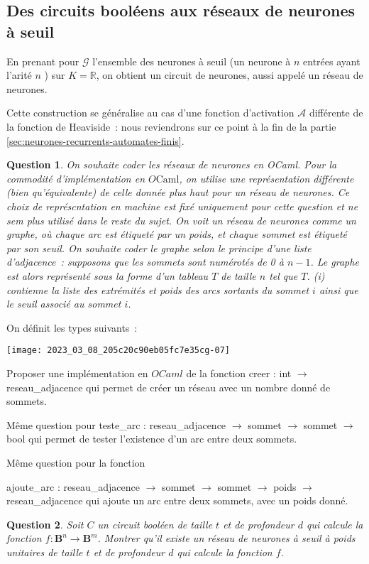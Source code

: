 \documentclass[10pt]{article}
\newtheorem{question}{Question}
\begin{document}
\subsection{Des circuits booléens aux réseaux de neurones à seuil}
En prenant pour $\mathcal{G}$ l'ensemble des neurones à seuil (un neurone à $n$ entrées ayant l'arité $n$ ) sur $K=ℝ$, on obtient un circuit de neurones, aussi appelé un réseau de neurones.

Cette construction se généralise au cas d'une fonction d'activation $\mathcal{A}$ différente de la fonction de Heaviside : nous reviendrons sur ce point à la fin de la partie \ref{sec:neurones-recurrents-automates-finis}. \begin{question}
	On souhaite coder les réseaux de neurones en OCaml. Pour la commodité d'implémentation en $O \mathrm{Caml}$, on utilise une représentation différente (bien qu'équivalente) de celle donnée plus haut pour un réseau de neurones. Ce choix de représcntation en machine est fixé uniquement pour cette question et ne sem plus utilisé dans le reste du sujet. On voit un réseau de neurones comme un graphe, où chaque arc est étiqueté par un poids, et chaque sommet est étiqueté par son seuil. On souhaite coder le graphe selon le principe d'une liste d'adjacence : supposons que les sommets sont numérotés de 0 à $n-1$. Le graphe est alors représenté sous la forme d'un tableau $T$ de taille $n$ tel que $T$. (i) contienne la liste des extrémités et poids des arcs sortants du sommet $i$ ainsi que le seuil associé au sommet $i$.
\end{question}

On définit les types suivants :

\begin{center}
\texttt{[image: 2023\_03\_08\_205c20c90eb05fc7e35cg-07]}
\end{center}

Proposer une implémentation en $O C a m l$ de la fonction creer : int $→$ reseau\_adjacence qui permet de créer un réseau avec un nombre donné de sommets.

Même question pour teste\_arc : reseau\_adjacence $→$ sommet $→$ sommet $→$ bool qui permet de tester l'existence d'un arc entre deux sommets.

Même question pour la fonction

ajoute\_arc : reseau\_adjacence $→$ sommet $→$ sommet $→$ poids $→$ reseau\_adjacence qui ajoute un arc entre deux sommets, avec un poids donné.

\begin{question}
	Soit $C$ un circuit booléen de taille $t$ et de profondeur $d$ qui calcule la fonction $f: \mathbf{B}^{n} → \mathbf{B}^{m}$. Montrer qu'il existe un réseau de neurones à seuil à poids unitaires de taille $t$ et de profondeur $d$ qui calcule la fonction $f$.
\end{question}
\end{document}
